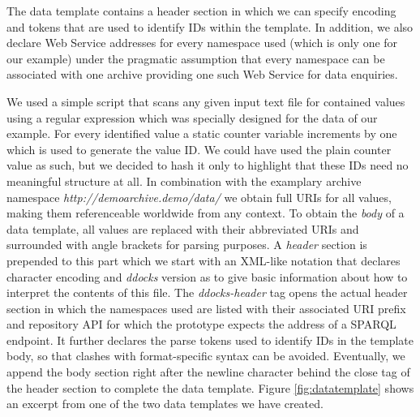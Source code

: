\documentclass{sig-alternate}
\begin{document}
The data template contains a header section in which we can specify encoding and tokens that are used to identify IDs within the template.
In addition, we also declare Web Service addresses for every namespace used (which is only one for our example) under the pragmatic assumption that every namespace can be associated with one archive providing one such Web Service for data enquiries.


We used a simple script that scans any given input text file for contained values using a regular expression which was specially designed for the data of our example.
For every identified value a static counter variable increments by one which is used to generate the value ID.
We could have used the plain counter value as such, but we decided to hash it only to highlight that these IDs need no meaningful structure at all.
In combination with the examplary archive namespace \textit{http://demoarchive.demo/data/} we obtain full URIs for all values, making them referenceable worldwide from any context.
To obtain the \textit{body} of a data template, all values are replaced with their abbreviated URIs and surrounded with angle brackets for parsing purposes.
A \textit{header} section is prepended to this part which we start with an XML-like notation that declares character encoding and \textit{ddocks} version as to give basic information about how to interpret the contents of this file.
The \textit{ddocks-header} tag opens the actual header section in which the namespaces used are listed with their associated URI prefix and repository API for which the prototype expects the address of a SPARQL endpoint.
It further declares the parse tokens used to identify IDs in the template body, so that clashes with format-specific syntax can be avoided.
Eventually, we append the body section right after the newline character behind the close tag of the header section to complete the data template.
Figure \ref{fig:datatemplate} shows an excerpt from one of the two data templates we have created.
\end{document}
